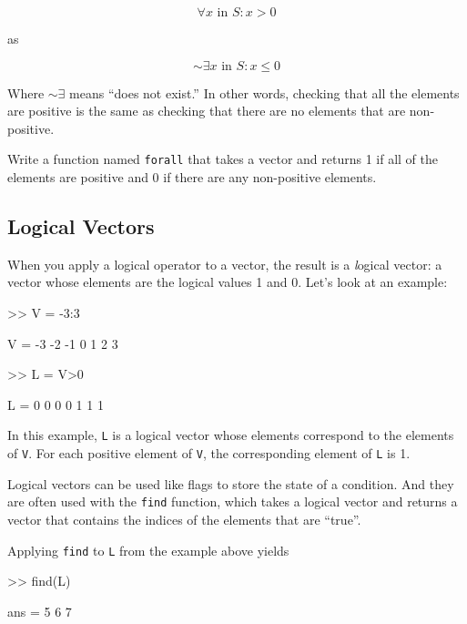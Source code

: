 \begin{equation}
\forall x \mbox{~in~} S: x>0
\end{equation}

as

\begin{equation}
\sim \exists x \mbox{~in~} S: x \le 0
\end{equation}

Where $\sim \exists$ means ``does not exist.''
In other words, checking that all the elements are positive is
the same as checking that there are no elements
that are non-positive.

\begin{ex}
Write a function named {\tt forall} that
takes a vector and returns 1 if all of the elements are positive
and 0 if there are any non-positive elements.
\end{ex}




\subsection{Logical Vectors}

When you apply a logical operator to a vector, the result is a 
{\emph logical vector}: a vector whose elements are the logical
values 1 and 0. Let's look at an example:


\begin{code}
>> V = -3:3

V = -3    -2    -1     0     1     2     3

>> L = V>0

L =  0     0     0     0     1     1     1
\end{code}

In this example, {\tt L} is a logical vector whose elements
correspond to the elements of {\tt V}.  For each positive element of
{\tt V}, the corresponding element of {\tt L} is 1.

Logical vectors can be used like flags to store the state of
a condition.  And they are often used with the {\tt find} function,
which takes a logical vector and returns a vector that contains
the indices of the elements that are ``true''.


Applying {\tt find} to {\tt L} from the example above yields

\begin{code}
>> find(L)

ans = 5     6     7
\end{code}

